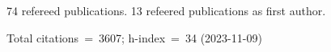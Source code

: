 74 refereed publications. 13 refeered publications as first author.

Total citations~=~3607; h-index~=~34 (2023-11-09)